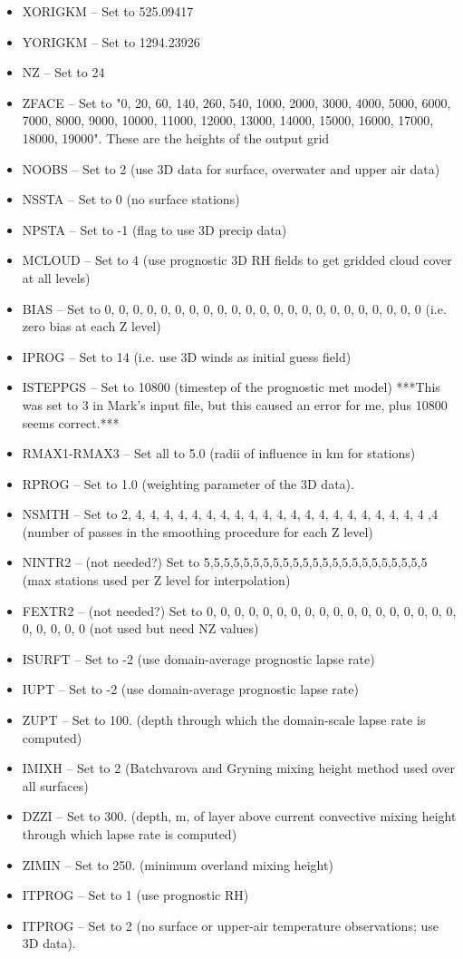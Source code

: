 \documentclass[10pt,a4paper]{article}
\begin{document}
\begin{itemize}
\begin{itemize}
\item XORIGKM -- Set to 525.09417
\item YORIGKM -- Set to 1294.23926
\item NZ -- Set to 24
\item ZFACE -- Set to "0, 20, 60, 140, 260, 540, 1000, 2000, 3000, 4000, 5000, 6000, 7000, 8000, 9000, 10000, 11000, 12000, 13000, 14000, 15000, 16000, 17000, 18000, 19000". These are the heights of the output grid
\item NOOBS -- Set to 2 (use 3D data for surface, overwater and upper air data)
\item NSSTA -- Set to 0 (no surface stations)
\item NPSTA -- Set to -1 (flag to use 3D precip data)
\item MCLOUD -- Set to 4 (use prognostic 3D RH fields to get gridded cloud cover at all levels)
\item BIAS -- Set to 0, 0, 0, 0, 0, 0, 0, 0, 0, 0, 0, 0, 0, 0, 0, 0, 0, 0, 0, 0, 0, 0, 0 (i.e. zero bias at each Z level)
\item IPROG -- Set to 14 (i.e. use 3D winds as initial guess field)
\item ISTEPPGS -- Set to 10800 (timestep of the prognostic met model) ***This was set to 3 in Mark's input file, but this caused an error for me, plus 10800 seems correct.***
\item RMAX1-RMAX3 -- Set all to 5.0 (radii of influence in km for stations)
\item RPROG -- Set to 1.0 (weighting parameter of the 3D data).
\item NSMTH -- Set to 2, 4, 4, 4, 4, 4, 4, 4, 4, 4, 4, 4, 4, 4, 4, 4, 4, 4, 4, 4, 4, 4 ,4 (number of passes in the smoothing procedure for each Z level)
\item NINTR2 -- (not needed?) Set to 5,5,5,5,5,5,5,5,5,5,5,5,5,5,5,5,5,5,5,5,5,5,5 (max stations used per Z level for interpolation)
\item FEXTR2 -- (not needed?) Set to 0, 0, 0, 0, 0, 0, 0, 0, 0, 0, 0, 0, 0, 0, 0, 0, 0, 0, 0, 0, 0, 0, 0 (not used but need NZ values)
\item ISURFT -- Set to -2 (use domain-average prognostic lapse rate)
\item IUPT -- Set to -2 (use domain-average prognostic lapse rate)
\item ZUPT -- Set to 100. (depth through which the domain-scale lapse rate is computed)
\item IMIXH -- Set to 2 (Batchvarova and Gryning mixing height method used over all surfaces)
\item DZZI -- Set to 300. (depth, m, of layer above current convective mixing height through which lapse rate is computed)
\item ZIMIN -- Set to 250. (minimum overland mixing height)
\item ITPROG -- Set to 1 (use prognostic RH)
\item ITPROG -- Set to 2 (no surface or upper-air temperature observations; use 3D data).
\end{itemize}
\end{itemize}
\end{document}

